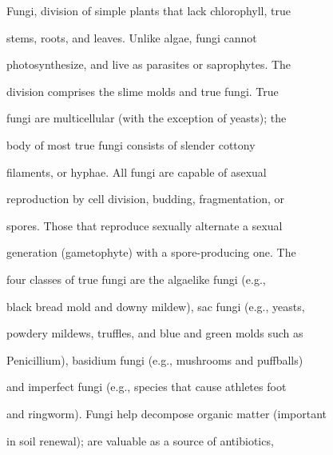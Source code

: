 Fungi, division of simple plants that lack chlorophyll, true$\text{ }$\newline{}

stems, roots, and leaves.  Unlike algae, fungi cannot$\text{ }$\newline{}

photosynthesize, and live as parasites or saprophytes.  The$\text{ }$\newline{}

division comprises the slime molds and true fungi.  True$\text{ }$\newline{}

fungi are multicellular (with the exception of yeasts); the$\text{ }$\newline{}

body of most true fungi consists of slender cottony$\text{ }$\newline{}

filaments, or hyphae.  All fungi are capable of asexual$\text{ }$\newline{}

reproduction by cell division, budding, fragmentation, or$\text{ }$\newline{}

spores.  Those that reproduce sexually alternate a sexual$\text{ }$\newline{}

generation (gametophyte) with a spore-{}producing one.  The$\text{ }$\newline{}

four classes of true fungi are the algaelike fungi (e.g.,$\text{ }$\newline{}

black bread mold and downy mildew), sac fungi (e.g., yeasts,$\text{ }$\newline{}

powdery mildews, truffles, and blue and green molds such as$\text{ }$\newline{}

Penicillium), basidium fungi (e.g., mushrooms and puffballs)$\text{ }$\newline{}

and imperfect fungi (e.g., species that cause athlete\textquotesingle{}s foot$\text{ }$\newline{}

and ringworm).  Fungi help decompose organic matter (important$\text{ }$\newline{}

in soil renewal); are valuable as a source of antibiotics,$\text{ }$\newline{}

